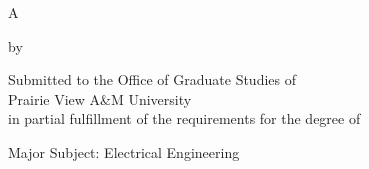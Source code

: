 %
%
%


\begin{titlepage}
\begin{center}

\vspace*{50 pt}
\MakeUppercase{\pvamumanuscripttitle}

\vspace{60 pt}
A \pvamupapertype

by

\MakeUppercase{\pvamufullname}

\vspace{60 pt}

\begin{singlespace}
Submitted to the Office of Graduate Studies of \\
Prairie View A\&M University \\
in partial fulfillment of the requirements for the degree of\\
\end{singlespace}

\vspace{20 pt}
\MakeUppercase{\pvamudegree}

\vspace{60 pt}

\pvamugradmonth \hspace{2pt} \pvamugradyear

\vspace{60 pt}

Major Subject: Electrical Engineering
\par\end{center}

\end{titlepage}
\pagebreak{}




